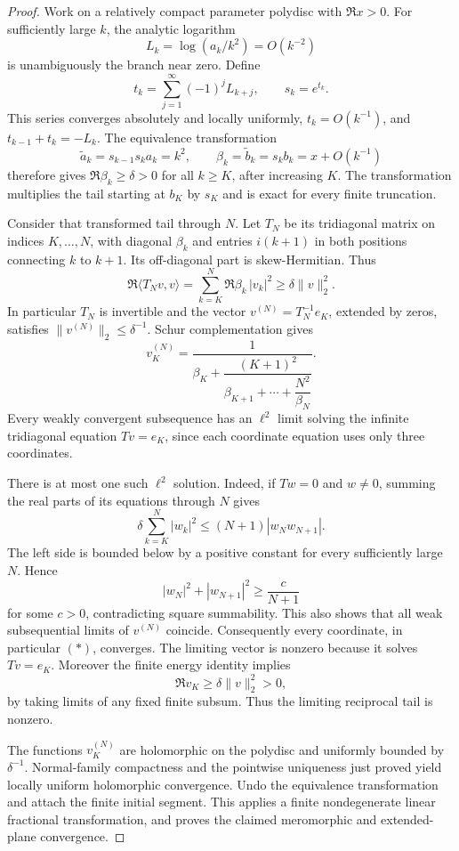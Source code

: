 \documentclass[11pt]{article}
\begin{document}
\begin{proof}
Work on a relatively compact parameter polydisc with \(\Re x>0\).
For sufficiently large \(k\), the analytic logarithm
\[
 L_k=\log(a_k/k^2)=O(k^{-2})
\]
is unambiguously the branch near zero. Define
\[
 t_k=\sum_{j=1}^{\infty}(-1)^j L_{k+j},\qquad s_k=e^{t_k}.
\]
This series converges absolutely and locally uniformly,
\(t_k=O(k^{-1})\), and \(t_{k-1}+t_k=-L_k\).
The equivalence transformation
\[
 \widetilde a_k=s_{k-1}s_ka_k=k^2,\qquad
 \beta_k=\widetilde b_k=s_kb_k=x+O(k^{-1})
\]
therefore gives \(\Re\beta_k\ge\delta>0\) for all \(k\ge K\),
after increasing \(K\). The transformation multiplies the tail
starting at \(b_K\) by \(s_K\) and is exact for every finite truncation.

Consider that transformed tail through \(N\). Let \(T_N\) be its
tridiagonal matrix on indices \(K,\ldots,N\), with diagonal
\(\beta_k\) and entries \(i(k+1)\) in both positions connecting
\(k\) to \(k+1\). Its off-diagonal part is skew-Hermitian. Thus
\[
 \Re\langle T_Nv,v\rangle
       =\sum_{k=K}^N\Re\beta_k\,|v_k|^2
       \ge\delta\|v\|_2^2.
\]
In particular \(T_N\) is invertible and the vector
\(v^{(N)}=T_N^{-1}e_K\), extended by zeros, satisfies
\(\|v^{(N)}\|_2\le\delta^{-1}\). Schur complementation gives
\[
 v_K^{(N)}
 =\frac{1}{\beta_K+
       \dfrac{(K+1)^2}{\beta_{K+1}+\cdots+
       \dfrac{N^2}{\beta_N}}}.
\tag{*}
\]
Every weakly convergent subsequence has an \(\ell^2\) limit solving
the infinite tridiagonal equation \(Tv=e_K\), since each coordinate
equation uses only three coordinates.

There is at most one such \(\ell^2\) solution. Indeed, if \(Tw=0\)
and \(w\ne0\), summing the real parts of its equations through \(N\)
gives
\[
 \delta\sum_{k=K}^N|w_k|^2
 \le (N+1)|w_Nw_{N+1}|.
\]
The left side is bounded below by a positive constant for every
sufficiently large \(N\). Hence
\[
 |w_N|^2+|w_{N+1}|^2\ge\frac{c}{N+1}
\]
for some \(c>0\), contradicting square summability. This also shows
that all weak subsequential limits of \(v^{(N)}\) coincide.
Consequently every coordinate, in particular \((*)\), converges.
The limiting vector is nonzero because it solves \(Tv=e_K\).
Moreover the finite energy identity implies
\[
 \Re v_K\ge\delta\|v\|_2^2>0,
\]
by taking limits of any fixed finite subsum. Thus the limiting
reciprocal tail is nonzero.

The functions \(v_K^{(N)}\) are holomorphic on the polydisc and
uniformly bounded by \(\delta^{-1}\). Normal-family compactness and
the pointwise uniqueness just proved yield locally uniform
holomorphic convergence. Undo the equivalence transformation and
attach the finite initial segment. This applies a finite
nondegenerate linear fractional transformation, and proves the
claimed meromorphic and extended-plane convergence.
\end{proof}
\end{document}
